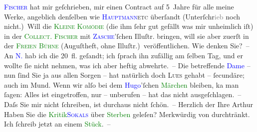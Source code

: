            \textcolor{blue}{\textsc{Fischer}}{}\ledrightnote{\textcolor{blue}{Samuel Fischer}} hat mir geſchrieben, mir einen Contract auf 5 Jahre für alle meine Werke,
               angeblich denſelben wie \textcolor{blue}{\textsc{Hauptmann}}{}\ledrightnote{\textcolor{blue}{Gerhart Hauptmann}}{ }\textsc{etc} überſandt (Unterſchr\textcolor{gray}{ieb} noch
               nicht.) Will die \textcolor{green}{\textsc{Kleine Komödie}}{}\ledrightnote{\textcolor{green}{Die kleine Komödie}} (die ihm ſehr gut gefällt was mir unheimlich iſt) in der \textcolor{green}{\textsc{Collect. Fischer}}{}\ledrightnote{\textcolor{green}{Collection Fischer}} mit {\pb}\textsc{\textcolor{blue}{Zasche}{}\ledrightnote{\textcolor{blue}{Theodor Zasche}}}’ſchen Illuſtr. bringen, will sie aber zuerſt in der \textcolor{green}{\textsc{Freien Bühne}}{}\ledrightnote{\textcolor{green}{Neue Deutsche Rundschau}} (Auguſtheft, ohne Illuſtr.) veröffentlichen. Wie denken Sie? –\pend
           \pstart
           An \textcolor{blue}{N.}{}\ledrightnote{\textcolor{blue}{Gabor Nobl}} hab ich die 20 fl. geſandt; ich ſprach ihn
               zufällig am ſelben Tag, und er wollte ſie nicht nehmen, was ich aber {\pb}heftig abwehrte. – Die betreffende \textcolor{blue}{Dame}{} – nun ſind Sie ja aus allen Sorgen – hat
               natürlich doch \textsc{Lues} gehabt – ſecundäre; auch im Mund. Wenn
               wir alſo bei dem \textcolor{blue}{Hugo}{}\ledrightnote{\textcolor{blue}{Hugo von Hofmannsthal}}’ſchen \textcolor{green}{Märchen}{}\ledrightnote{\textcolor{green}{Das Märchen der 672. Nacht}} bleiben, ka{\geminationn} man ſagen:
               Alles ist eingetroffen, nur – unberufen – hat das \label{K_L00450_1v}\label{K_L00450_1h} nicht ausgeſchlagen. – Daſs Sie {\pb}mir nicht ſchreiben, ist durchaus nicht ſchön. –\pend
           \pstart Herzlich der Ihre \spacefill\mbox{Arthur}\pend{}\pstart
           Haben Sie die \textcolor{green}{Kritik}{}\textcolor{blue}{\textsc{Sokals}}{}\ledrightnote{\textcolor{blue}{Clemens Sokal}} über \textcolor{green}{Sterben}{}\ledrightnote{\textcolor{green}{Sterben. Novelle}} geleſen? Merkwürdig von \label{K_L00450_2v}\label{K_L00450_2h} durchtränkt.\pend
           \pstart
           Ich ſchreib jetzt an einem \textcolor{green}{Stück}{}. –\pend
           \endnumbering{}  
      